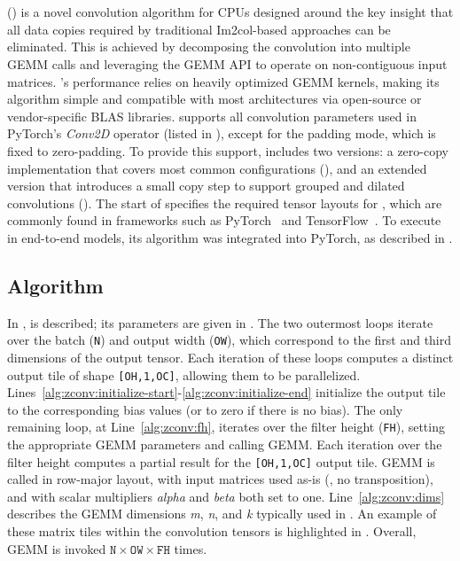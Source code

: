 \section{\algfullname}
\label{sec:zconv-intro}

\algfullname (\algname) is a novel convolution algorithm for CPUs designed around the key insight that all data copies required by traditional Im2col-based approaches can be eliminated.
This is achieved by decomposing the convolution into multiple GEMM calls and leveraging the GEMM API to operate on non-contiguous input matrices.
\algname's performance relies on heavily optimized GEMM kernels, making its algorithm simple and compatible with most architectures via open-source or vendor-specific BLAS libraries.
\algname supports all convolution parameters used in PyTorch's \emph{Conv2D} operator (listed in ), except for the padding mode, which is fixed to zero-padding.
To provide this support, \algname includes two versions: a zero-copy implementation that covers most common configurations (), and an extended version that introduces a small copy step to support grouped and dilated convolutions ().
The start of  specifies the required tensor layouts for \algname, which are commonly found in frameworks such as PyTorch~\cite{pytorch2024} and TensorFlow~\cite{tensorflow}. 
To execute \algname in end-to-end models, its algorithm was integrated into PyTorch, as described in .

\subsection{\algname Algorithm}
\label{sec:zconv-alg}

In , \algname is described; its parameters are given in .
The two outermost loops iterate over the batch (\texttt{N}) and output width (\texttt{OW}), which correspond to the first and third dimensions of the output tensor.
Each iteration of these loops computes a distinct output tile of shape \texttt{[OH,1,OC]}, allowing them to be parallelized.
Lines~\ref{alg:zconv:initialize-start}-\ref{alg:zconv:initialize-end} initialize the output tile to the corresponding bias values (or to zero if there is no bias).
The only remaining loop, at Line~\ref{alg:zconv:fh}, iterates over the filter height (\texttt{FH}), setting the appropriate GEMM parameters and calling GEMM.
Each iteration over the filter height computes a partial result for the \texttt{[OH,1,OC]} output tile.
GEMM is called in row-major layout, with input matrices used as-is (\ie, no transposition), and with scalar multipliers \emph{alpha} and \emph{beta} both set to one.
Line~\ref{alg:zconv:dims} describes the GEMM dimensions \emph{m}, \emph{n}, and \emph{k} typically used in \algname.
An example of these matrix tiles within the convolution tensors is highlighted in .
Overall, GEMM is invoked $\texttt{N}\times\texttt{OW}\times\texttt{FH}$ times.

